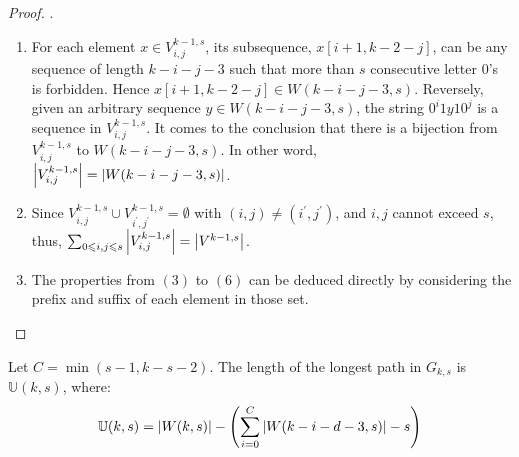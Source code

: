 \begin{proof}
    {\color{white}.}
    
    \begin{enumerate}
        \item For each element $x\in V^{k-1,s}_{i,j}$, its subsequence, $x[i+1,k-2-j]$, can be any sequence of length $k-i-j-3$ such that more than $s$ consecutive letter $0$'s is forbidden. Hence $x[i+1,k-2-j]\in W(k-i-j-3,s)$. Reversely, given an arbitrary sequence $y\in W(k-i-j-3,s)$, the string $0^{i}1y10^{j}$ is a sequence in $V^{k-1,s}_{i,j}$. It comes to the conclusion that there is a bijection from $V^{k-1,s}_{i,j}$ to $W(k-i-j-3,s)$. In other word, $\left \lvert  V^{k-1,s}_{i,j} \right \rvert = \left \lvert  W(k-i-j-3,s) \right \rvert $.
        
        \item Since $V^{k-1,s}_{i,j}\cup V^{k-1,s}_{i^{\prime},j^{\prime}} = \emptyset$ with $(i,j)\neq(i^{\prime},j^{\prime})$, and $i,j$ cannot exceed $s$, thus, $\sum_{0\leqslant i,j\leqslant s}\left \lvert  V^{k-1,s}_{i,j} \right \rvert = \left \lvert  V^{k-1,s} \right \rvert$.
        
        \item The properties from $(3)$ to $(6)$ can be deduced directly by considering the prefix and suffix of each element in those set.
    \end{enumerate}
\end{proof}



\begin{theorem}\label{theo:maximal_length}
    Let $C=\min{(s-1,k-s-2)}$. The length of the longest path in $G_{k,s}$ is $\mathbb{U}(k,s)$, where:
    \begin{align}
        \mathbb{U}(k,s) = \left \lvert  W(k,s) \right \rvert - \left(\sum_{i=0}^{C}\left \lvert  W(k-i-d-3,s) \right \rvert - s\right)
    \end{align}
\end{theorem}

